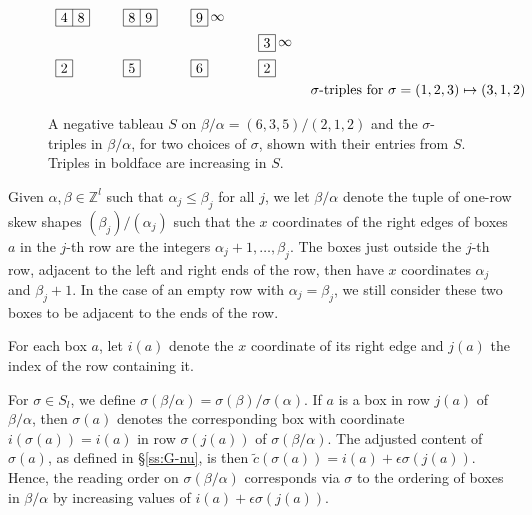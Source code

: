 \documentclass[12pt]{amsart}
\theoremstyle{definition}
\theoremstyle{remark}
\newcommand{\ZZ}{{\mathbb Z}}
\newcommand{\ctild}{\tilde{c}}
\begin{document}
\begin{figure}
\[\begin{array}{cc}
\begin{tikzpicture}[scale=.425]
\draw [shift={(4,3)}] (-1,0) grid (1,1);
\node at (3.5,3.5) {$4$};
\node at (4.5,3.5) {$8$};
\draw [shift={(4,0)}] (-1,0) grid (0,1);
\node at (3.5,.5) {$2$};

\draw [shift={(8,3)}] (-1,0) grid (1,1);
\node at (7.5,3.5) {$8$};
\node at (8.5,3.5) {$9$};
\draw [shift={(8,0)}] (-1,0) grid (0,1);
\node at (7.5,.5) {$5$};

\draw [shift={(12,3)}] (-1,0) grid (0,1);
\node at (11.5,3.5) {$9$};
\node [right] at (12,3.5) {$\! \infty $};
\draw [shift={(12,0)}] (-1,0) grid (0,1);
\node at (11.5,.5) {$6$};

\draw [shift={(16,1.5)}] (-1,0) grid (0,1);
\node at (15.5,2) {$3$};
\node [right] at (16,2) {$\! \infty $};
\draw [shift={(16,0)}] (-1,0) grid (0,1);
\node at (15.5,.5) {$2$};
\end{tikzpicture} \\
& \text{$\sigma $-triples for $\sigma = (1,2,3)\mapsto (3,1,2)$}
\end{array}
\]
\caption{\label{fig:sigma triples}
A negative tableau $S$ on $\beta/\alpha = (6,3,5)/(2,1,2)$ and the
$\sigma$-triples in $\beta/\alpha$, for two choices of $\sigma $,
shown with their entries from $S$.  Triples in boldface are increasing
in $S$.}
\end{figure}

Given $\alpha ,\beta \in \ZZ ^{l}$ such that $\alpha _{j}\leq \beta
_{j}$ for all $j$, we let $\beta /\alpha $ denote the tuple of
one-row skew
%
%
shapes $(\beta _{j})/(\alpha _{j})$ such that the $x$ coordinates of
the right edges of boxes $a$ in the $j$-th row are the integers
$\alpha _{j}+1,\ldots,\beta _{j}$.  The boxes just outside the $j$-th
row, adjacent to the left and right ends of the row, then have $x$
coordinates $\alpha _{j}$ and $\beta _{j}+1$.  In the case of an empty
row with $\alpha _{j} = \beta _{j}$, we still consider these two boxes
to be adjacent to the ends of the row.

For each box $a$, let $i(a)$ denote the $x$ coordinate of its right
edge and $j(a)$ the index of the row containing it.

For $\sigma \in S_{l}$, we define $\sigma (\beta /\alpha ) = \sigma
(\beta )/\sigma (\alpha )$.  If $a$ is a box in row $j(a)$ of $\beta
/\alpha $, then $\sigma (a)$ denotes the corresponding box with
coordinate $i(\sigma (a)) = i(a)$ in row $\sigma (j(a))$ of $\sigma
(\beta /\alpha )$.  The adjusted content of $\sigma (a)$, as defined
in \S \ref{ss:G-nu}, is then $\ctild (\sigma (a)) = i(a)+\epsilon
\sigma (j(a))$. Hence, the reading order on $\sigma (\beta /\alpha )$
corresponds via $\sigma $ to the ordering of boxes in $\beta /\alpha $
by increasing values of $i(a)+\epsilon \sigma (j(a))$.
\end{document}
